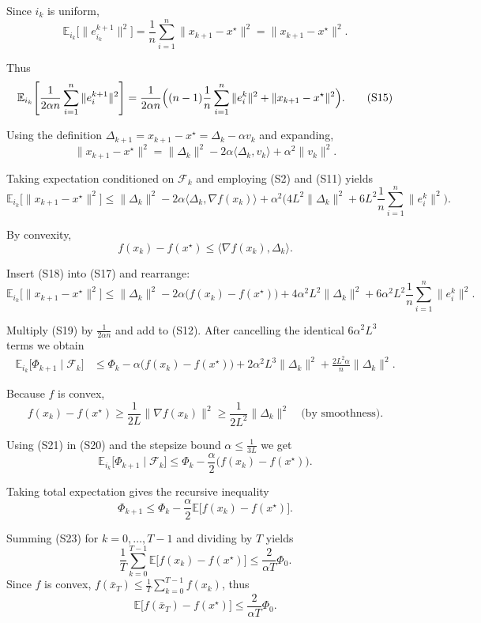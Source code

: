 \documentclass{article}
\newcommand{\E}{\mathbb{E}}
\newcommand{\grad}{\nabla}
\begin{document}
Since $i_k$ is uniform,
\[
\E_{i_k}\!\bigl[\|e_{i_k}^{k+1}\|^2\bigr]
= \frac1n\sum_{i=1}^n\|x_{k+1}-x^\star\|^2
= \|x_{k+1}-x^\star\|^2 .
\tag{S14}
\]

Thus
\[
\E_{i_k}\!\left[\frac{1}{2\alpha n}\sum_{i=1}^n\|e_i^{k+1}\|^2\right]
= \frac{1}{2\alpha n}\Bigl((n-1)\frac{1}{n}\sum_{i=1}^n\|e_i^{k}\|^2
      +\|x_{k+1}-x^\star\|^2\Bigr) .
\tag{S15}
\]

Using the definition $\Delta_{k+1}=x_{k+1}-x^\star = \Delta_k-\alpha v_k$ and expanding,
\[
\|x_{k+1}-x^\star\|^2
= \|\Delta_k\|^2 -2\alpha\langle\Delta_k,v_k\rangle +\alpha^2\|v_k\|^2 .
\tag{S16}
\]

Taking expectation conditioned on $\mathcal{F}_k$ and employing (S2) and (S11) yields
\[
\E_{i_k}\!\bigl[\|x_{k+1}-x^\star\|^2\bigr]
\le \|\Delta_k\|^2 -2\alpha\langle\Delta_k,\grad f(x_k)\rangle
      +\alpha^2\bigl(4L^2\|\Delta_k\|^2
      +6L^2\frac{1}{n}\sum_{i=1}^n\|e_i^k\|^2\bigr).
\tag{S17}
\]

By convexity,
\[
f(x_k)-f(x^\star)\le\langle\grad f(x_k),\Delta_k\rangle .
\tag{S18}
\]

Insert (S18) into (S17) and rearrange:
\[
\E_{i_k}\!\bigl[\|x_{k+1}-x^\star\|^2\bigr]
\le \|\Delta_k\|^2 -2\alpha\bigl(f(x_k)-f(x^\star)\bigr)
   +4\alpha^2L^2\|\Delta_k\|^2
   +6\alpha^2L^2\frac{1}{n}\sum_{i=1}^n\|e_i^k\|^2 .
\tag{S19}
\]

Multiply (S19) by $\frac{1}{2\alpha n}$ and add to (S12). After cancelling the identical $6\alpha^2L^3$ terms we obtain
\[
\begin{aligned}
\E_{i_k}\!\bigl[\Phi_{k+1}\mid\mathcal{F}_k\bigr]
&\le \Phi_k
   -\alpha\bigl(f(x_k)-f(x^\star)\bigr)
   +2\alpha^2L^3\|\Delta_k\|^2
   +\frac{2L^2\alpha}{n}\|\Delta_k\|^2 .
\end{aligned}
\tag{S20}
\]

Because $f$ is convex,
\[
f(x_k)-f(x^\star)\ge \frac{1}{2L}\|\grad f(x_k)\|^2
\ge \frac{1}{2L^2}\|\Delta_k\|^2 \quad\text{(by smoothness)} .
\tag{S21}
\]

Using (S21) in (S20) and the stepsize bound $\alpha\le\frac{1}{3L}$ we get
\[
\E_{i_k}\!\bigl[\Phi_{k+1}\mid\mathcal{F}_k\bigr]
\le \Phi_k -\frac{\alpha}{2}\bigl(f(x_k)-f(x^\star)\bigr) .
\tag{S22}
\]

Taking total expectation gives the recursive inequality
\[
\Phi_{k+1}\le \Phi_k-\frac{\alpha}{2}\E\!\bigl[f(x_k)-f(x^\star)\bigr] .
\tag{S23}
\]

Summing (S23) for $k=0,\dots,T-1$ and dividing by $T$ yields
\[
\frac{1}{T}\sum_{k=0}^{T-1}\E\!\bigl[f(x_k)-f(x^\star)\bigr]
\le \frac{2}{\alpha T}\Phi_0 .
\]
Since $f$ is convex, $f(\bar x_T)\le\frac{1}{T}\sum_{k=0}^{T-1}f(x_k)$, thus
\[
\E\!\bigl[f(\bar x_T)-f(x^\star)\bigr]\le\frac{2}{\alpha T}\Phi_0 .
\tag{S24}
\]
\end{document}
